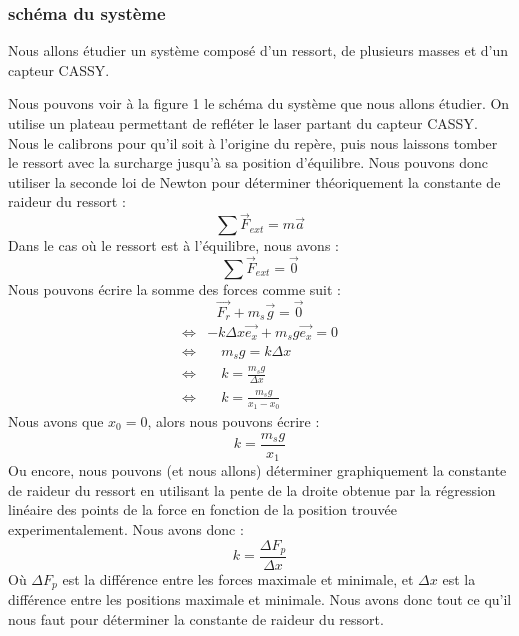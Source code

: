         \subsubsection{schéma du système}
            Nous allons étudier un système composé d'un ressort, de plusieurs masses et d'un capteur CASSY.
            
            Nous pouvons voir à la figure 1 le schéma du système que nous allons étudier. On 
            utilise un plateau permettant de refléter le laser partant du capteur CASSY.
            Nous le calibrons pour qu'il soit à l'origine du repère, puis nous laissons
            tomber le ressort avec la surcharge jusqu'à sa position d'équilibre.
            Nous pouvons donc utiliser la seconde loi de Newton pour déterminer théoriquement
            la constante de raideur du ressort : 
            \begin{equation}
                \sum \vec{F}_{ext} = m \vec{a}
            \end{equation}
            Dans le cas où le ressort est à l'équilibre, nous avons :
            \begin{equation}
                \sum \vec{F}_{ext} = \vec{0}
            \end{equation}
            Nous pouvons écrire la somme des forces comme suit :
            \begin{equation}
                \vec{F_r} + m_s\vec{g} = \vec{0}
            \end{equation}
            \begin{align*}
                \Leftrightarrow & -k\Delta x \vec{e_x} + m_s g \vec{e_x} = 0 \\
                \Leftrightarrow & \quad m_s g = k \Delta x \\
                \Leftrightarrow & \quad k = \frac{m_s g}{\Delta x} \\
                \Leftrightarrow & \quad k = \frac{m_s g}{x_1 - x_0}
            \end{align*}
            Nous avons que $x_0 = 0$, alors nous pouvons écrire :
            \begin{equation}
                k = \frac{m_s g}{x_1}
            \end{equation}
            Ou encore, nous pouvons (et nous allons) déterminer graphiquement la constante
            de raideur du ressort en utilisant la pente de la droite obtenue
            par la régression linéaire des points de la force en fonction de la position trouvée
            experimentalement. Nous avons donc :
            \begin{equation}
                k = \frac{\Delta F_p}{\Delta x}
            \end{equation}
            Où $\Delta F_p$ est la différence entre les forces maximale et minimale,
            et $\Delta x$ est la différence entre les positions maximale et minimale.
            \newline
            Nous avons donc tout ce qu'il nous faut pour déterminer la constante de raideur
            du ressort.


